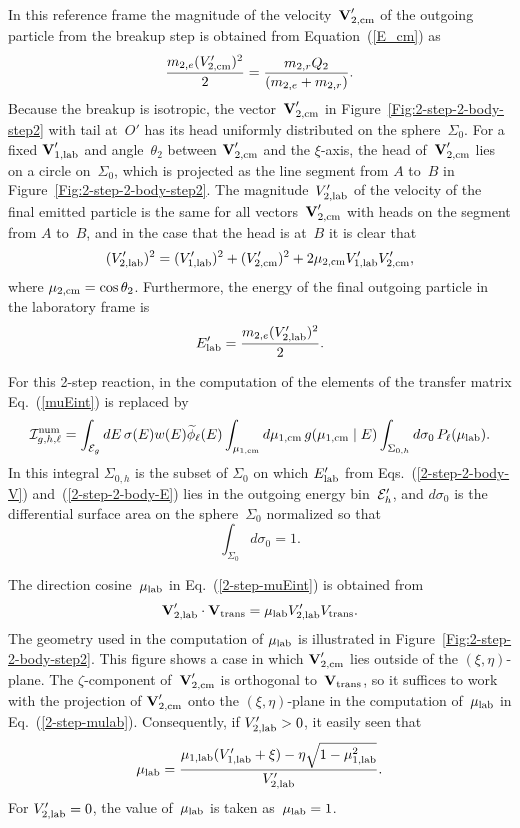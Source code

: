 {In this reference frame the magnitude of the
velocity~$\textbf{V}_{\text{2,cm}}'$ of the outgoing
particle from the breakup step is obtained from Equation~(\ref{E_cm})
as
$$
  \frac{m_{2,e} (V_{\text{2,cm}}')^2}{2} =
    \frac{ m_{2,r} Q_2} { ( m_{2,e} + m_{2,r} ) }.
$$
Because the breakup is isotropic, the vector~$\textbf{V}_{\text{2,cm}}'$ in 
Figure~\ref{Fig:2-step-2-body-step2} 
with tail at~$O'$ has its head uniformly distributed on
the sphere~$\Sigma_0$.  For a fixed $\textbf{V}_{\text{1,lab}}'$ and angle~$\theta_2$
between $\textbf{V}_{\text{2,cm}}'$ and the $\xi$-axis, the head of~$\textbf{V}_{\text{2,cm}}'$ lies
on a circle on~$\Sigma_0$, which is projected as the line segment from
$A$ to~$B$ in  Figure~\ref{Fig:2-step-2-body-step2}.
The magnitude~$V_{\text{2,lab}}'$ of the velocity of the final emitted
particle is the same for all vectors~$\textbf{V}_{\text{2,cm}}'$ with heads on
the segment from $A$ to~$B$, and in the case that the head is
at~$B$ it is clear that
\begin{equation}
  ({V_{\text{2,lab}}'})^2 = (V_{\text{1,lab}}')^2 + (V_{\text{2,cm}}')^2 +
    2 \mu_{\text{2,cm}} V_{\text{1,lab}}' V_{\text{2,cm}}',
 \label{2-step-2-body-V}
\end{equation}
where $\mu_{\text{2,cm}} = \cos \theta_2$.
Furthermore, the energy of the final outgoing particle in the
laboratory frame is
\begin{equation}
  E_{\text{lab}}' = \frac{ m_{2,e} (V_{\text{2,lab}}')^2 }{2}.
 \label{2-step-2-body-E}
\end{equation}

For this 2-step reaction, in the computation of the
elements of the transfer matrix Eq.~(\ref{muEint}) is
replaced by
\begin{equation}
    {\cal I}^{\text{num}}_{g,h,\ell} =
     \int_{{\cal E}_g} dE \, \sigma ( E ) w(E) \widetilde \phi_\ell(E) 
    \int_{\mu_{\text{1,cm}}} d\mu_{\text{1,cm}}  \, g(\mu_{\text{1,cm}} \mid E)
    \int_{\Sigma_{0,h}} d\sigma_0 \, P_\ell( \mu_{\text{lab}} ).
  \label{2-step-muEint}
\end{equation}
In this integral $\Sigma_{0,h}$ is the subset of $\Sigma_0$ on which
$E_{\text{lab}}'$ from Eqs.~(\ref{2-step-2-body-V}) and~(\ref{2-step-2-body-E})
lies in the outgoing energy bin~${\cal E}_h'$,
and $d\sigma_0$ is the differential surface area
on the sphere~$\Sigma_0$ normalized so that
$$
  \int_{\Sigma_0} d\sigma_0 = 1.
$$

The direction cosine~$\mu_{\text{lab}}$ in Eq.~(\ref{2-step-muEint})
is obtained from
\begin{equation}
  \textbf{V}_{\text{2,lab}}' \cdot \textbf{V}_{\text{trans}} = \mu_{\text{lab}}  V_{\text{2,lab}}' V_{\text{trans}}.
  \label{2-step-mulab}
\end{equation}
The geometry used in the computation of $\mu_{\text{lab}}$ is illustrated
in Figure~\ref{Fig:2-step-2-body-step2}.  
This figure shows a case in which
$\textbf{V}_{\text{2,cm}}'$ lies outside of the $(\xi, \eta)$-plane.  The
$\zeta$-component of~$\textbf{V}_{\text{2,cm}}'$ is orthogonal to~$\textbf{V}_{\text{trans}}$,
so it suffices to work with the projection of $\textbf{V}_{\text{2,cm}}'$ onto
the $(\xi, \eta)$-plane in the computation of~$\mu_{\text{lab}}$
in Eq.~(\ref{2-step-mulab}).  Consequently, if $V_{\text{2,lab}}' > 0$, it easily seen that
\begin{equation}
  \mu_{\text{lab}} = \frac{ \mu_{\text{1,lab}} ( V_{\text{1,lab}}' + \xi ) - \eta \sqrt{ 1 - \mu_{\text{1,lab}}^2 } }
             { V_{\text{2,lab}}'}.
  \label{2-step-mulab-xi}
\end{equation} 
For $V_{\text{2,lab}}' = 0$, the value of~$\mu_{\text{lab}}$
is taken as~$\mu_{\text{lab}} = 1$.

}
